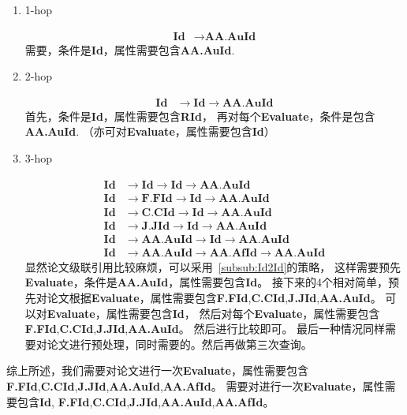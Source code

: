 \documentclass[hyperref,UTF8]{ctexart}
\theoremstyle{definition}
\theoremstyle{remark}
\numberwithin{equation}{subsection}
\newcommand{\Emph}{\textbf}
\newcommand{\Evaluate}{\Emph{Evaluate}}
\newcommand{\Id}{\Emph{Id}}
\newcommand{\RId}{\Emph{RId}}
\newcommand{\FFId}{\Emph{F.FId}}
\newcommand{\CCId}{\Emph{C.CId}}
\newcommand{\JJId}{\Emph{J.JId}}
\newcommand{\AAAuId}{\Emph{AA.AuId}}
\newcommand{\AAAfId}{\Emph{AA.AfId}}
\begin{document}
	\begin{enumerate}[(1)]
		
		\item 1-hop
		
		\begin{align}
			\Id &\rightarrow \AAAuId	\label{equ:id-auid}
		\end{align}
		需要，条件是\Id，属性需要包含\AAAuId.
		
		\item 2-hop
		
		\begin{align}
			\Id &\rightarrow \Id \rightarrow \AAAuId	\label{equ:id-id-auid}
		\end{align}
		首先，条件是\Id，属性需要包含\RId，
		再对每个\Evaluate，条件是包含\AAAuId.
		（亦可对\Evaluate，属性需要包含\Id）
		
		\item 3-hop
		
		\begin{align}
			\Id &\rightarrow \Id \rightarrow \Id \rightarrow \AAAuId		\label{equ:id-id-id-auid}	\\
			\Id &\rightarrow \FFId \rightarrow \Id \rightarrow \AAAuId		\label{equ:id-fid-id-auid}	\\
			\Id &\rightarrow \CCId \rightarrow \Id \rightarrow \AAAuId		\label{equ:id-cid-id-auid}	\\
			\Id &\rightarrow \JJId \rightarrow \Id \rightarrow \AAAuId		\label{equ:id-jid-id-auid}	\\
			\Id &\rightarrow \AAAuId \rightarrow \Id \rightarrow \AAAuId	\label{equ:id-auid-id-auid}	\\
			\Id &\rightarrow \AAAuId \rightarrow \AAAfId \rightarrow \AAAuId \label{equ:id-auid-afid-auid}
		\end{align}
		显然论文级联引用比较麻烦，可以采用~\ref{subsub:Id2Id}的策略，
		这样需要预先\Evaluate，条件是\AAAuId，属性需要包含\Id。
		接下来的4个相对简单，预先对论文根据\Evaluate，属性需要包含\FFId,\CCId,\JJId,\AAAuId。
		可以对\Evaluate，属性需要包含\Id，
		然后对每个\Evaluate，属性需要包含\FFId,\CCId,\JJId,\AAAuId。
		然后进行比较即可。
		最后一种情况同样需要对论文进行预处理，同时需要的。然后再做第三次查询。
		
	\end{enumerate}
	
	综上所述，我们需要对论文进行一次\Evaluate，属性需要包含\FFId,\CCId,\JJId,\AAAuId,\AAAfId。
	需要对进行一次\Evaluate，属性需要包含\Id, \FFId,\CCId,\JJId,\AAAuId,\AAAfId。
	
\end{document}
